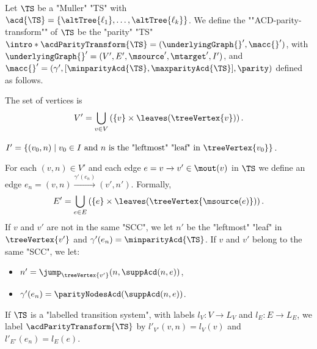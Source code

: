 \documentclass[10pt,a4paper]{amsart}
\let\ab\allowbreak
\renewcommand{\gg}{\gamma}
\newcommand{\tand}{\text{ and }}
\newcommand{\re}[1]{\xrightarrow{#1}}
\begin{document}
\begin{definition}\label{def:parityTransformationACD}
	 Let $\TS$ be a "Muller" "TS" with  $\acd{\TS} = \{\altTree{\ell_1}\ab,\ab \dots,\ab \altTree{\ell_k}\}$. 
	 \AP We define the ""ACD-parity-transform"" of $\TS$  be the "parity" "TS" $\intro*\acdParityTransform{\TS} = (\underlyingGraph{}', \macc{}')$, with $\underlyingGraph{}' = (V', E', \msource', \mtarget', I')$, and $\macc{}' = (\gg', \ab[\minparityAcd{\TS},\ab \maxparityAcd{\TS}], \parity)$ defined as follows.
	 \begin{description}
	 	\setlength\itemsep{2mm}
	 	\item[Vertices.] The set of vertices is \[V'= \bigcup_{v\in V} \left( \{v\}\times \leaves(\treeVertex{v}) \right).\]
	 	
	 	\item[Initial vertices.] %
	 	$I' = \{ (v_0, n) \mid v_0\in I \tand n \text{ is the "leftmost" "leaf" in } \treeVertex{v_0} \}$.
	 	
	 	\item[Edges and output colours.] For each $(v,n)\in V'$ and each edge $e = v\re{}v'\in \mout(v)$ in $\TS$ we define an edge $e_n = (v,n)\re{\gg'(e_n)} (v',n')$. Formally, 
	 	\[E'= \bigcup_{e\in E} \left( \{e\}\times \leaves(\treeVertex{\msource(e)}) \right).\]
	 	 If $v$ and $v'$ are not in the same "SCC", we let $n'$ be the "leftmost" "leaf" in $\treeVertex{v'}$ and $\gg'(e_n) = \minparityAcd{\TS}$.\footnotemark{} If $v$ and $v'$ belong to the same "SCC", we let:
	 	\begin{itemize}
	 		\item $n' = \jump_{\treeVertex{v'}}(n, \suppAcd(n,e))$,
	 		\item $\gg'(e_n) = \parityNodesAcd(\suppAcd(n,e))$.
	 	\end{itemize}
 	
 		\item[Labellings.]If $\TS$ is a "labelled transition system", with labels $l_V\colon V \to L_V$ and $l_E\colon E \to L_E$, we label $\acdParityTransform{\TS}$ by $l'_{V'}(v,n) = l_V(v)$ and $l'_{E'}(e_n) = l_E(e)$.
	 \end{description}
\end{definition}
\end{document}

